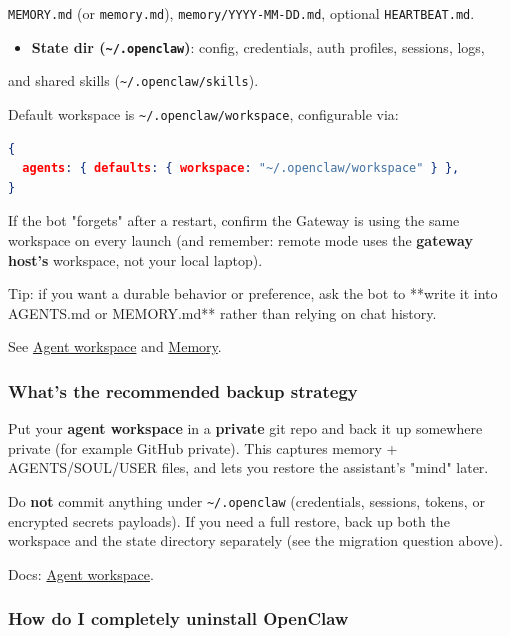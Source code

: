 \texttt{MEMORY.md} (or \texttt{memory.md}), \texttt{memory/YYYY-MM-DD.md}, optional \texttt{HEARTBEAT.md}.
\begin{itemize}
  \item \textbf{State dir (\texttt{\textasciitilde{}/.openclaw})}: config, credentials, auth profiles, sessions, logs,
\end{itemize}

and shared skills (\texttt{\textasciitilde{}/.openclaw/skills}).

Default workspace is \texttt{\textasciitilde{}/.openclaw/workspace}, configurable via:

\begin{lstlisting}[language=json]
{
  agents: { defaults: { workspace: "~/.openclaw/workspace" } },
}
\end{lstlisting}


If the bot "forgets" after a restart, confirm the Gateway is using the same
workspace on every launch (and remember: remote mode uses the \textbf{gateway host's}
workspace, not your local laptop).

Tip: if you want a durable behavior or preference, ask the bot to **write it into
AGENTS.md or MEMORY.md** rather than relying on chat history.

See \href{/concepts/agent-workspace}{Agent workspace} and \href{/concepts/memory}{Memory}.

\subsubsection{What's the recommended backup strategy}


Put your \textbf{agent workspace} in a \textbf{private} git repo and back it up somewhere
private (for example GitHub private). This captures memory + AGENTS/SOUL/USER
files, and lets you restore the assistant's "mind" later.

Do \textbf{not} commit anything under \texttt{\textasciitilde{}/.openclaw} (credentials, sessions, tokens, or encrypted secrets payloads).
If you need a full restore, back up both the workspace and the state directory
separately (see the migration question above).

Docs: \href{/concepts/agent-workspace}{Agent workspace}.

\subsubsection{How do I completely uninstall OpenClaw}


